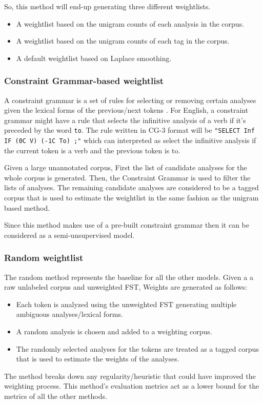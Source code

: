 \documentclass[free]{flammie}
\begin{document}
So, this method will end-up generating three different weightlists.
\begin{itemize}
\setlength\itemsep{0.5em}
\item A weightlist based on the unigram counts of each analysis in the corpus.
\item A weightlist based on the unigram counts of each tag in the corpus.
\item A default weightlist based on Laplace smoothing.
\end{itemize}

\subsubsection{Constraint Grammar-based weightlist}
A constraint grammar is a set of rules for selecting or removing certain
analyses given the lexical forms of the previous/next tokens
\cite{karlsson1990constraint}. For English, a constraint grammar might have a
rule that selects the infinitive analysis of a verb if it's preceded by the word
\texttt{to}. The rule written in CG-3 format will be \texttt{"SELECT Inf IF (0C
V) (-1C To) ;"} which can interpreted as select the infinitive analysis if the
current token is a verb and the previous token is to.

Given a large unannotated corpus, First the list of candidate analyses for the
whole corpus is generated. Then, the Constraint Grammar is used to filter the
lists of analyses. The remaining candidate analyses are considered to be a
tagged corpus that is used to estimate the weightlist in the same fashion as the
unigram based method.

Since this method makes use of a pre-built constraint grammar then it can be
considered as a semi-unsupervised model.

\subsubsection{Random weightlist}
The random method represents the baseline for all the other models. Given a a
raw unlabeled corpus and unweighted FST, Weights are generated as follows:
\begin{itemize}
\item Each token is analyzed using the unweighted FST generating multiple
    ambiguous analyses/lexical forms.
\item A random analysis is chosen and added to a weighting corpus.
\item The randomly selected analyses for the tokens are treated as a tagged
    corpus that is used to estimate the weights of the analyses.
\end{itemize}
The method breaks down any regularity/heuristic that could have improved the
weighting process. This method's evaluation metrics act as a lower bound for the
metrics of all the other methods.
\end{document}
